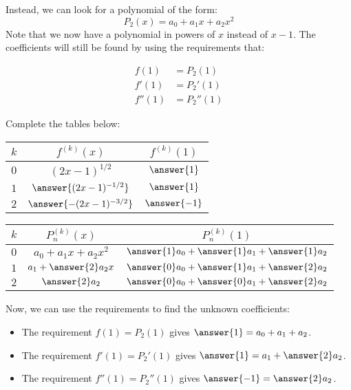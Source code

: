 \documentclass{ximera}
\begin{document}
\begin{exercise}
\begin{exercise}
\begin{exercise}
Instead, we can look for a polynomial of the form:
\[
P_2(x) = a_0 +a_1x+a_2x^2
\]
Note that we now have a polynomial in powers of $x$ instead of $x-1$.  The coefficients will still be found by using the requirements that:

\begin{align*}
f(1) &= P_2(1) \\
f'(1) &= P_2'(1) \\
f''(1) &= P_2''(1) 
\end{align*} 

Complete the tables below:

\begin{tabular}{|c||c|c|}
\hline
$k$ \quad & \quad \quad $f^{(k)}(x)$  \quad \quad & \quad \quad $f^{(k)}(1)$ \quad \quad \\
\hline 
$0$ \quad & \quad \quad $(2x-1)^{1/2}$  \quad \quad & \quad \quad $\answer{1}$ \quad \quad  \\
\hline
$1$ \quad & \quad \quad $\answer{(2x-1)^{-1/2}}$ \quad \quad & \quad \quad $\answer{1}$ \quad \quad \\
\hline
$2$ \quad & \quad \quad $\answer{-(2x-1)^{-3/2}}$ \quad \quad & \quad \quad $\answer{-1}$ \quad \quad \\
\hline 
\end{tabular}

\begin{tabular}{|c||c|c|}
\hline
$k$ \quad & \quad \quad $P_n^{(k)}(x)$  \quad \quad & \quad \quad $P_n^{(k)}(1)$ \quad \quad \\
\hline 
$0$ \quad & \quad \quad $a_0+a_1x+a_2x^2$  \quad \quad & \quad \quad $\answer{1}a_0+\answer{1}a_1+\answer{1}a_2$ \quad \quad  \\
\hline
$1$ \quad & \quad \quad $a_1+\answer{2}a_2x$ \quad \quad & \quad \quad  $\answer{0}a_0+\answer{1}a_1+\answer{2}a_2$ \quad \quad \\
\hline
$2$ \quad & \quad \quad $\answer{2}a_2$ \quad \quad & \quad \quad  $\answer{0}a_0+\answer{0}a_1+\answer{2}a_2$ \quad \quad \\
\hline
\end{tabular}

\begin{exercise}
Now, we can use the requirements to find the unknown coefficients:

\begin{itemize}
\item The requirement $f(1) = P_2(1)$ gives $\answer{1}=a_0+a_1+a_2$. 
\item The requirement $f'(1) = P_2'(1)$ gives $\answer{1} = a_1 +\answer{2}a_2$. 
\item The requirement $f''(1) = P_2''(1)$ gives $\answer{-1} = \answer{2}a_2$. 
\end{itemize}


\end{exercise}
\end{exercise}
\end{exercise}
\end{exercise}
\end{document}
